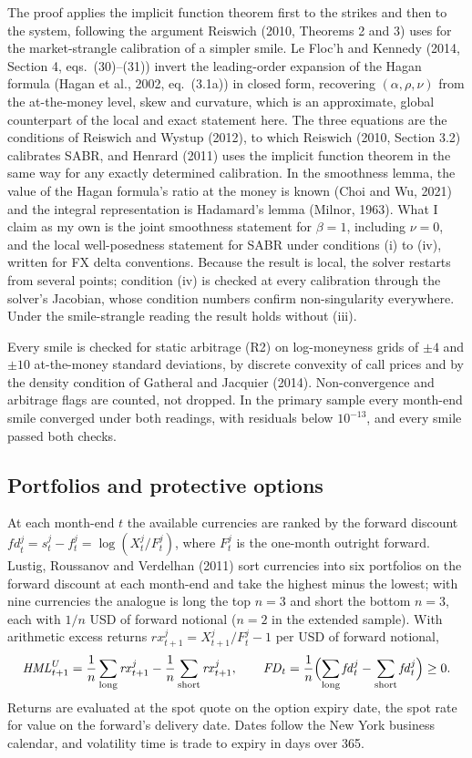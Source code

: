\documentclass[11pt]{article}
\theoremstyle{result}
\newcommand{\HML}{\mathit{HML}}
\newcommand{\FD}{\mathit{FD}}
\newcommand{\fd}{\mathit{fd}}
\newcommand{\rx}{\mathit{rx}}
\begin{document}
The proof applies the implicit function theorem first to the strikes and then to the system, following the argument Reiswich (2010, Theorems 2 and 3) uses for the market-strangle calibration of a simpler smile. Le Floc'h and Kennedy (2014, Section 4, eqs.~(30)--(31)) invert the leading-order expansion of the Hagan formula (Hagan et al., 2002, eq.~(3.1a)) in closed form, recovering $(\alpha,\rho,\nu)$ from the at-the-money level, skew and curvature, which is an approximate, global counterpart of the local and exact statement here. The three equations are the conditions of Reiswich and Wystup (2012), to which Reiswich (2010, Section 3.2) calibrates SABR, and Henrard (2011) uses the implicit function theorem in the same way for any exactly determined calibration. In the smoothness lemma, the value of the Hagan formula's ratio at the money is known (Choi and Wu, 2021) and the integral representation is Hadamard's lemma (Milnor, 1963). What I claim as my own is the joint smoothness statement for $\beta=1$, including $\nu=0$, and the local well-posedness statement for SABR under conditions (i) to (iv), written for FX delta conventions. Because the result is local, the solver restarts from several points; condition (iv) is checked at every calibration through the solver's Jacobian, whose condition numbers confirm non-singularity everywhere. Under the smile-strangle reading the result holds without (iii).

Every smile is checked for static arbitrage (R2) on log-moneyness grids of $\pm4$ and $\pm10$ at-the-money standard deviations, by discrete convexity of call prices and by the density condition of Gatheral and Jacquier (2014). Non-convergence and arbitrage flags are counted, not dropped. In the primary sample every month-end smile converged under both readings, with residuals below $10^{-13}$, and every smile passed both checks.

\subsection{Portfolios and protective options}

At each month-end $t$ the available currencies are ranked by the forward discount $\fd^j_t=s^j_t-f^j_t=\log(X^j_t/F^j_t)$, where $F^j_t$ is the one-month outright forward. Lustig, Roussanov and Verdelhan (2011) sort currencies into six portfolios on the forward discount at each month-end and take the highest minus the lowest; with nine currencies the analogue is long the top $n=3$ and short the bottom $n=3$, each with $1/n$ USD of forward notional ($n=2$ in the extended sample). With arithmetic excess returns $\rx^j_{t+1}=X^j_{t+1}/F^j_t-1$ per USD of forward notional,
\[
\HML^U_{t+1}=\frac1n\sum_{\text{long}}\rx^j_{t+1}-\frac1n\sum_{\text{short}}\rx^j_{t+1},\qquad
\FD_t=\frac1n\Bigl(\sum_{\text{long}}\fd^j_t-\sum_{\text{short}}\fd^j_t\Bigr)\ge0.
\]
Returns are evaluated at the spot quote on the option expiry date, the spot rate for value on the forward's delivery date. Dates follow the New York business calendar, and volatility time is trade to expiry in days over 365.
\end{document}
